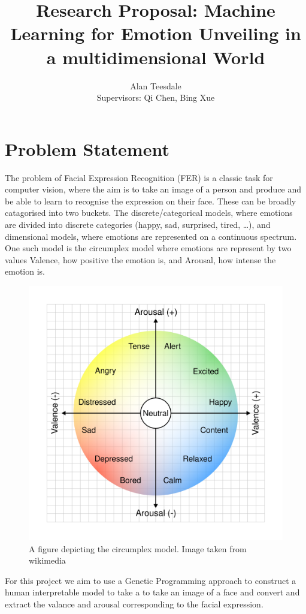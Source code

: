 \documentclass[7.5pt,twocolumn]{article}
\title{Research Proposal: Machine Learning for Emotion Unveiling in a multidimensional World}
\author{Alan Teesdale\\{\small Supervisors: Qi Chen, Bing Xue}}
\begin{document}
	\maketitle
	\section{Problem Statement}
	
	The problem of Facial Expression Recognition (FER) is a classic task for computer vision, where the aim is to take an image of a person and produce and be able to learn to recognise the expression on their face. These can be broadly catagorised into two buckets. The discrete/categorical models, where emotions are divided into discrete categories (happy, sad, surprised, tired, \dots), and dimensional models, where emotions are represented on a continuous spectrum. One such model is the circumplex model\supercite{Circumplex} where emotions are represent by two values Valence, how positive the emotion is, and Arousal, how intense the emotion is.
	\begin{figure}[H]
		\centering
		\includegraphics[width=0.8\linewidth]{Circumplex_model_of_emotion}
		\caption{A figure depicting the circumplex model. Image taken from wikimedia\supercite{wiki:img}}
		\label{fig:circumplexmodelofemotion}
	\end{figure}
	For this project we aim to use a Genetic Programming approach to construct a human interpretable model to take a to take an image of a face and convert and extract the valance and arousal corresponding to the facial expression.
\end{document}
